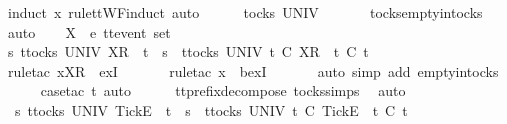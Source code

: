 %
\isadelimproof
%
\endisadelimproof
%
\isatagproof
{}\isamarkupfalse%
\ {\isacharparenleft}induct\ x\ rule{\isacharcolon}ttWF{\isachardot}induct{\isacharcomma}\ auto{\isacharparenright}\isanewline
\ \ \isamarkupfalse%
\ {\isachardoublequoteopen}{\isacharbrackleft}{\isacharbrackright}\ {\isasymin}\ tocks\ UNIV{\isachardoublequoteclose}\ \isanewline
\ \ \ \ \isamarkupfalse%
\ tocks{\isachardot}empty{\isacharunderscore}in{\isacharunderscore}tocks\ \isamarkupfalse%
\ auto\isanewline
{}\isamarkupfalse%
\isanewline
\ \ \isamarkupfalse%
\ X\ {\isacharcolon}{\isacharcolon}\ {\isachardoublequoteopen}{\isacharprime}e\ ttevent\ set{\isachardoublequoteclose}\isanewline
\ \ \isamarkupfalse%
\ {\isachardoublequoteopen}{\isasymexists}s{\isachardot}\ {\isasymexists}t{\isasymin}tocks\ UNIV{\isachardot}\ {\isacharbrackleft}{\isacharbrackleft}X{\isacharbrackright}\isactrlsub R{\isacharbrackright}\ {\isacharequal}\ t\ {\isacharat}\ s\ {\isasymand}\ {\isacharparenleft}{\isasymforall}t{\isacharprime}{\isasymin}tocks\ UNIV{\isachardot}\ t{\isacharprime}\ {\isasymle}\isactrlsub C\ {\isacharbrackleft}{\isacharbrackleft}X{\isacharbrackright}\isactrlsub R{\isacharbrackright}\ {\isasymlongrightarrow}\ t{\isacharprime}\ {\isasymle}\isactrlsub C\ t{\isacharparenright}{\isachardoublequoteclose}\isanewline
\ \ \ \ \isamarkupfalse%
\ {\isacharparenleft}rule{\isacharunderscore}tac\ x{\isacharequal}{\isachardoublequoteopen}{\isacharbrackleft}{\isacharbrackleft}X{\isacharbrackright}\isactrlsub R{\isacharbrackright}{\isachardoublequoteclose}\ \ exI{\isacharparenright}\ \isanewline
\ \ \ \ \isamarkupfalse%
\ {\isacharparenleft}rule{\isacharunderscore}tac\ x{\isacharequal}{\isachardoublequoteopen}{\isacharbrackleft}{\isacharbrackright}{\isachardoublequoteclose}\ \ bexI{\isacharparenright}\isanewline
\ \ \ \ \ \isamarkupfalse%
\ {\isacharparenleft}auto\ simp\ add{\isacharcolon}\ empty{\isacharunderscore}in{\isacharunderscore}tocks{\isacharparenright}\isanewline
\ \ \ \ \isamarkupfalse%
\ {\isacharparenleft}case{\isacharunderscore}tac\ t{\isacharprime}{\isacharcomma}\ auto{\isacharparenright}\isanewline
\ \ \ \ \isamarkupfalse%
\ tt{\isacharunderscore}prefix{\isacharunderscore}decompose\ tocks{\isachardot}simps\ \isamarkupfalse%
\ auto\isanewline
{}\isamarkupfalse%
\isanewline
\ \ \isamarkupfalse%
\ {\isachardoublequoteopen}\ {\isasymexists}s{\isachardot}\ {\isasymexists}t{\isasymin}tocks\ UNIV{\isachardot}\ {\isacharbrackleft}{\isacharbrackleft}Tick{\isacharbrackright}\isactrlsub E{\isacharbrackright}\ {\isacharequal}\ t\ {\isacharat}\ s\ {\isasymand}\ {\isacharparenleft}{\isasymforall}t{\isacharprime}{\isasymin}tocks\ UNIV{\isachardot}\ t{\isacharprime}\ {\isasymle}\isactrlsub C\ {\isacharbrackleft}{\isacharbrackleft}Tick{\isacharbrackright}\isactrlsub E{\isacharbrackright}\ {\isasymlongrightarrow}\ t{\isacharprime}\ {\isasymle}\isactrlsub C\ t{\isacharparenright}{\isachardoublequoteclose}\isanewline
